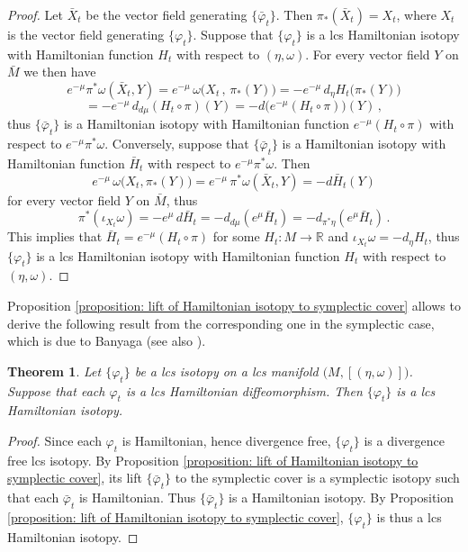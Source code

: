 \documentclass{amsart}
\newtheorem{thm}{Theorem}[section]
\theoremstyle{remark}
\begin{document}
\begin{proof}
Let $\bar{X}_t$ be the vector field generating $\{ \bar{\varphi}_t \}$.
Then $\pi_{\ast} (\bar{X}_t) = X_t$,
where $X_t$ is the vector field generating $\{\varphi_t\}$.
Suppose that $\{\varphi_t\}$ is a lcs Hamiltonian isotopy
with Hamiltonian function $H_t$
with respect to $(\eta, \omega)$.
For every vector field $Y$ on $\bar{M}$
we then have
\[
e^{-\mu} \pi^{\ast}\omega (\bar{X}_t, Y)
= e^{-\mu} \, \omega \big( X_t \,,\, \pi_{\ast}(Y) \big)
= - e^{-\mu} \, d_{\eta} H_t \big(\pi_{\ast}(Y)\big)
\]
\[
= - e^{-\mu} \, d_{d\mu} (H_t \circ \pi) (Y)
= - d \big( e^{-\mu} (H_t \circ \pi ) \big) (Y) \,,
\]
thus $\{ \bar{\varphi}_t \}$ is a Hamiltonian isotopy
with Hamiltonian function $e^{-\mu} (H_t \circ \pi)$
with respect to $e^{-\mu} \pi^{\ast}\omega$.
Conversely,
suppose that $\{ \bar{\varphi}_t \}$ is a Hamiltonian isotopy
with Hamiltonian function $\bar{H}_t$
with respect to $e^{-\mu} \pi^{\ast}\omega$.
Then
\[
e^{-\mu} \, \omega \big(X_t, \pi_{\ast}(Y)\big)
= e^{-\mu} \, \pi^{\ast} \omega (\bar{X}_t, Y)
= - d \bar{H}_t (Y)
\]
for every vector field $Y$ on $\bar{M}$,
thus
\[
\pi^{\ast} (\iota_{X_t}\omega) = - e^{\mu} \, d \bar{H}_t
= - d_{d\mu} (e^{\mu} \bar{H}_t)
= - d_{\pi^{\ast}\eta} (e^{\mu} \bar{H}_t) \,.
\]
This implies that $\bar{H}_t = e^{-\mu} (H_t \circ \pi)$
for some $H_t: M \rightarrow \mathbb{R}$
and $\iota_{X_t} \omega = - d_{\eta}H_t$,
thus $\{\varphi_t\}$ is a lcs Hamiltonian isotopy
with Hamiltonian function $H_t$
with respect to $(\eta, \omega)$.
\end{proof}

Proposition \ref{proposition: lift of Hamiltonian isotopy to symplectic cover}
allows to derive the following result
from the corresponding one in the symplectic case,
which is due to Banyaga \cite{Banyaga}
(see also \cite[Proposition 10.2.12]{McDS}).

\begin{thm}\label{theorem: Banyaga}
Let $\{\varphi_t\}$ be a lcs isotopy
on a lcs manifold $\big( M , [(\eta, \omega)] \big)$.
Suppose that each $\varphi_t$ is a lcs Hamiltonian diffeomorphism.
Then $\{\varphi_t\}$ is a lcs Hamiltonian isotopy.
\end{thm}

\begin{proof}
Since each $\varphi_t$ is Hamiltonian,
hence divergence free,
$\{\varphi_t\}$ is a divergence free lcs isotopy.
By Proposition \ref{proposition: lift of Hamiltonian isotopy to symplectic cover},
its lift $\{\bar{\varphi}_t\}$ to the symplectic cover
is a symplectic isotopy such that each $\bar{\varphi}_t$ is Hamiltonian.
Thus $\{\bar{\varphi}_t\}$ is a Hamiltonian isotopy.
By Proposition \ref{proposition: lift of Hamiltonian isotopy to symplectic cover},
$\{\varphi_t\}$ is thus a lcs Hamiltonian isotopy.
\end{proof}
\end{document}
